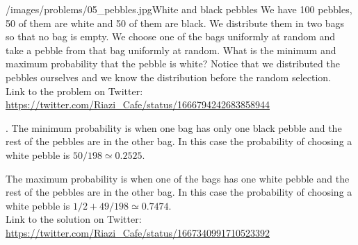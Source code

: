 \begin{problem}{/images/problems/05_pebbles.jpg}{White and black pebbles}
    We have 100 pebbles, 50 of them are white and 50 of them are black. We distribute them in two bags so that no bag is empty. We choose one of the bags uniformly at random and take a pebble from that bag uniformly at random. What is the minimum and maximum probability that the pebble is white? Notice that we distributed the pebbles ourselves and we know the distribution before the random selection.\\[0.2cm]

Link to the problem on Twitter:  \url{https://twitter.com/Riazi_Cafe/status/1666794242683858944}
\end{problem}
\begin{solution}.
The minimum probability is when one bag has only one black pebble and the rest of the pebbles are in the other bag. In this case the probability of choosing a white pebble is $50/198 \simeq 0.2525$.

The maximum probability is when one of the bags has one white pebble and the rest of the pebbles are in the other bag.  In this case the probability of choosing a white pebble is $1/2 + 49/198 \simeq 0.7474$.\\[0.2cm]

Link to the solution on Twitter:  \url{https://twitter.com/Riazi_Cafe/status/1667340991710523392}
\end{solution}